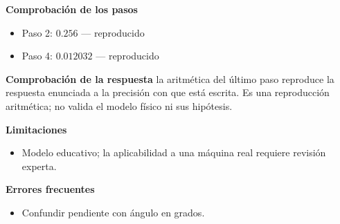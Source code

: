 \documentclass[10pt,openany]{book}
\begin{document}
\begin{tcolorbox}[title={Problema resuelto 3}, studiumworked, breakable]
\noindent\textbf{Comprobación de los pasos}
\begin{itemize}
\item Paso 2: $0.256$ — reproducido
\item Paso 4: $0.012032$ — reproducido
\end{itemize}

\noindent\textbf{Comprobación de la respuesta} la aritmética del último paso reproduce la respuesta enunciada a la precisión con que está escrita. Es una reproducción aritmética; no valida el modelo físico ni sus hipótesis.

\noindent\textbf{Limitaciones}
\begin{itemize}
\item Modelo educativo; la aplicabilidad a una máquina real requiere revisión experta.
\end{itemize}

\noindent\textbf{Errores frecuentes}
\begin{itemize}
\item Confundir pendiente con ángulo en grados.
\end{itemize}
\end{tcolorbox}
\end{document}
